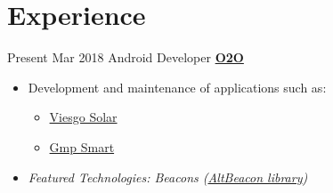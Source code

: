 \documentclass[letterpaper]{twentysecondcv} %
\begin{document}
\makeprofile %


\section{Experience}

\begin{twenty} %
\twentyitem
    	{Present}
		{Mar 2018}
        {Android Developer}
        {\href{www.mo2o.com}{\textbf{O2O}}}
        {}
        {\begin{itemize}
        
        	\item Development and maintenance of applications such as:
        		{\begin{itemize}
        		\item\href{https://play.google.com/store/apps/details?id=com.viesgo.solar&hl=es}{Viesgo Solar}
         		\end{itemize}}
         		{\begin{itemize}
        		\item\href{https://play.google.com/store/apps/details?id=com.mo2o.gmp}{Gmp Smart}
         		\end{itemize}}
         	
        	\item \textit{Featured Technologies: Beacons (\href{https://github.com/AltBeacon/android-beacon-library}{AltBeacon library})}
        

\end{itemize}}
\end{twenty}
\end{document}
